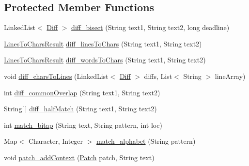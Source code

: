 \subsection*{Protected Member Functions}
\begin{DoxyCompactItemize}
\item 
Linked\+List$<$ \hyperlink{classorg_1_1buildmlearn_1_1toolkit_1_1utilities_1_1diff__match__patch_1_1Diff}{Diff} $>$ \hyperlink{classorg_1_1buildmlearn_1_1toolkit_1_1utilities_1_1diff__match__patch_a05df843fb762717a833b3f94008ed0e1}{diff\+\_\+bisect} (String text1, String text2, long deadline)
\item 
\hyperlink{classorg_1_1buildmlearn_1_1toolkit_1_1utilities_1_1diff__match__patch_1_1LinesToCharsResult}{Lines\+To\+Chars\+Result} \hyperlink{classorg_1_1buildmlearn_1_1toolkit_1_1utilities_1_1diff__match__patch_a3a517130c3822a26a829ecd454518e98}{diff\+\_\+lines\+To\+Chars} (String text1, String text2)
\item 
\hyperlink{classorg_1_1buildmlearn_1_1toolkit_1_1utilities_1_1diff__match__patch_1_1LinesToCharsResult}{Lines\+To\+Chars\+Result} \hyperlink{classorg_1_1buildmlearn_1_1toolkit_1_1utilities_1_1diff__match__patch_a2a5e54e86f526975a09f163554113327}{diff\+\_\+words\+To\+Chars} (String text1, String text2)
\item 
void \hyperlink{classorg_1_1buildmlearn_1_1toolkit_1_1utilities_1_1diff__match__patch_a6bbc36a35836b9d64843ccab34efa555}{diff\+\_\+chars\+To\+Lines} (Linked\+List$<$ \hyperlink{classorg_1_1buildmlearn_1_1toolkit_1_1utilities_1_1diff__match__patch_1_1Diff}{Diff} $>$ diffs, List$<$ String $>$ line\+Array)
\item 
int \hyperlink{classorg_1_1buildmlearn_1_1toolkit_1_1utilities_1_1diff__match__patch_a3ee3c894e278b4d3b2150f7e2ad2eb41}{diff\+\_\+common\+Overlap} (String text1, String text2)
\item 
String\mbox{[}$\,$\mbox{]} \hyperlink{classorg_1_1buildmlearn_1_1toolkit_1_1utilities_1_1diff__match__patch_ab8d8b6ab62b5b964ba1a1f389773ddf9}{diff\+\_\+half\+Match} (String text1, String text2)
\item 
int \hyperlink{classorg_1_1buildmlearn_1_1toolkit_1_1utilities_1_1diff__match__patch_a6f018d498c2a8197f74fb889acd2515e}{match\+\_\+bitap} (String text, String pattern, int loc)
\item 
Map$<$ Character, Integer $>$ \hyperlink{classorg_1_1buildmlearn_1_1toolkit_1_1utilities_1_1diff__match__patch_a9cb7acc41c1d2f90c02c9489888f36f8}{match\+\_\+alphabet} (String pattern)
\item 
void \hyperlink{classorg_1_1buildmlearn_1_1toolkit_1_1utilities_1_1diff__match__patch_a78639823b3a4a12e1a6e492b7f378feb}{patch\+\_\+add\+Context} (\hyperlink{classorg_1_1buildmlearn_1_1toolkit_1_1utilities_1_1diff__match__patch_1_1Patch}{Patch} patch, String text)
\end{DoxyCompactItemize}
